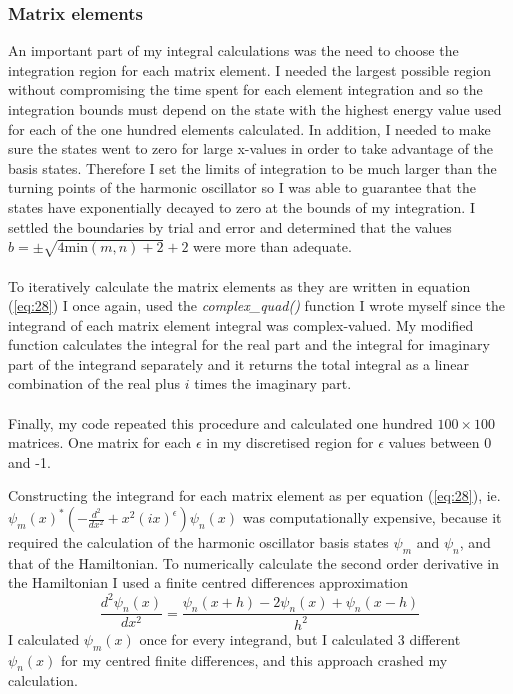 \documentclass[10pt, a4paper, singlespacing, headsepline]{report}
\begin{document}
\subsubsection{Matrix elements}\label{Elements}
An important part of my integral calculations was the need to choose the integration region for each matrix element. I needed the largest possible region without compromising the time spent for each element integration and so the integration bounds must depend on the state with the highest energy value used for each of the one hundred elements calculated. In addition, I needed to make sure the states went to zero for large x-values in order to take advantage of the basis states. Therefore I set the limits of integration to be much larger than the turning points of the harmonic oscillator so I was able to guarantee that the states have exponentially decayed to zero at the bounds of my integration. I settled the boundaries by trial and error and determined that the values $b  = \pm \sqrt{4 \mathrm{min}(m,n) + 2} + 2$ were more than adequate.\\\\
To iteratively calculate the matrix elements as they are written in equation (\ref{eq:28}) I once again, used the \emph{complex\_quad()} function I wrote myself since the integrand of each matrix element integral was complex-valued. My modified function calculates the integral for the real part and the integral for imaginary part of the integrand separately and it returns the total integral as a linear combination of the real plus $i$ times the imaginary part.\\
\\Finally, my code repeated this procedure and calculated one hundred $100\times100$ matrices. One matrix for each $\epsilon$ in my discretised region for $\epsilon$ values between 0 and -1.

Constructing the integrand for each matrix element as per equation (\ref{eq:28}), ie. \mbox{$\psi_m(x)^* \left (  - \frac{d^2}{dx^2} + x^2(ix)^{\epsilon}\right ) \psi_n(x)$} was computationally expensive, because it required the calculation of the harmonic oscillator basis states $\psi_m$ and $\psi_n$, and that of the Hamiltonian. To numerically calculate the second order derivative in the Hamiltonian I used a finite centred differences approximation
\begin{equation}\label{eq:29}
\frac{d^2 \psi_n(x)}{dx^2} = \frac{\psi_n(x + h) - 2 \psi_n(x) + \psi_n(x - h)}{h^2}
\end{equation}
I calculated $\psi_m(x)$ once for every integrand, but I calculated 3 different $\psi_n(x)$ for my centred finite differences, and this approach crashed my calculation.\\
\end{document}
